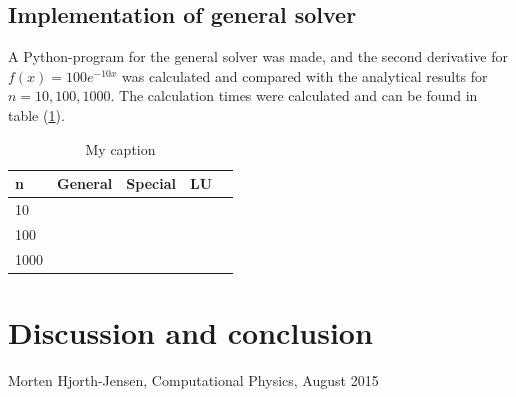\documentclass[12pt]{article}
\begin{document}
\subsection{Implementation of general solver}
A Python-program for the general solver was made, and the second derivative for $f(x)=100e^{-10x}$ was calculated and compared with the analytical results for $n = 10, 100, 1000$. The calculation times were calculated and can be found in table (\ref{tab:general}).


\begin{table}[]
\centering
\caption{My caption}
\label{tab:general}
\begin{tabular}{|l|l|l|l|l|}
\hline
n    & General & Special & LU &  \\ \hline
10   &         &         &    &  \\ \hline
100  &         &         &    &  \\ \hline
1000 &         &         &    &  \\ \hline
\end{tabular}
\end{table}

\section{Discussion and conclusion}



















\begin{flushleft}

\begin{thebibliography}{}

\singlespacing
\small




  
  Morten Hjorth-Jensen,
  Computational Physics,
  August 2015
  
\end{thebibliography}
\end{flushleft}
\end{document}
